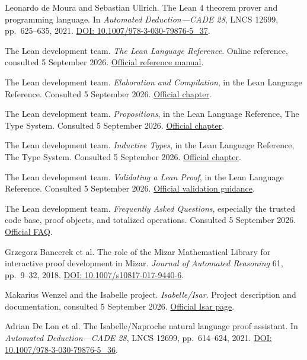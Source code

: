 \documentclass[11pt,a4paper]{article}
\newcommand{\source}[2]{\href{#1}{#2}}
\begin{document}
\begin{thebibliography}{99}
Leonardo de Moura and Sebastian Ullrich.
The Lean 4 theorem prover and programming language.
In \emph{Automated Deduction---CADE 28}, LNCS 12699, pp.~625--635, 2021.
\source{https://doi.org/10.1007/978-3-030-79876-5_37}{DOI: 10.1007/978-3-030-79876-5\_37}.

The Lean development team.
\emph{The Lean Language Reference}.
Online reference, consulted 5 September 2026.
\source{https://lean-lang.org/doc/reference/latest/}{Official reference manual}.

The Lean development team.
\emph{Elaboration and Compilation}, in the Lean Language Reference.
Consulted 5 September 2026.
\source{https://lean-lang.org/doc/reference/latest/Elaboration-and-Compilation/}{Official chapter}.

The Lean development team.
\emph{Propositions}, in the Lean Language Reference, The Type System.
Consulted 5 September 2026.
\source{https://lean-lang.org/doc/reference/latest/The-Type-System/Propositions/}{Official chapter}.

The Lean development team.
\emph{Inductive Types}, in the Lean Language Reference, The Type System.
Consulted 5 September 2026.
\source{https://lean-lang.org/doc/reference/latest/The-Type-System/Inductive-Types/}{Official chapter}.

The Lean development team.
\emph{Validating a Lean Proof}, in the Lean Language Reference.
Consulted 5 September 2026.
\source{https://lean-lang.org/doc/reference/latest/ValidatingProofs/}{Official validation guidance}.

The Lean development team.
\emph{Frequently Asked Questions}, especially the trusted code base, proof objects, and totalized operations.
Consulted 5 September 2026.
\source{https://lean-lang.org/faq/}{Official FAQ}.

Grzegorz Bancerek et al.
The role of the Mizar Mathematical Library for interactive proof development in Mizar.
\emph{Journal of Automated Reasoning} 61, pp.~9--32, 2018.
\source{https://doi.org/10.1007/s10817-017-9440-6}{DOI: 10.1007/s10817-017-9440-6}.

Makarius Wenzel and the Isabelle project.
\emph{Isabelle/Isar}.
Project description and documentation, consulted 5 September 2026.
\source{https://isabelle.in.tum.de/Isar/}{Official Isar page}.

Adrian De Lon et al.
The Isabelle/Naproche natural language proof assistant.
In \emph{Automated Deduction---CADE 28}, LNCS 12699, pp.~614--624, 2021.
\source{https://doi.org/10.1007/978-3-030-79876-5_36}{DOI: 10.1007/978-3-030-79876-5\_36}.


\end{thebibliography}
\end{document}
